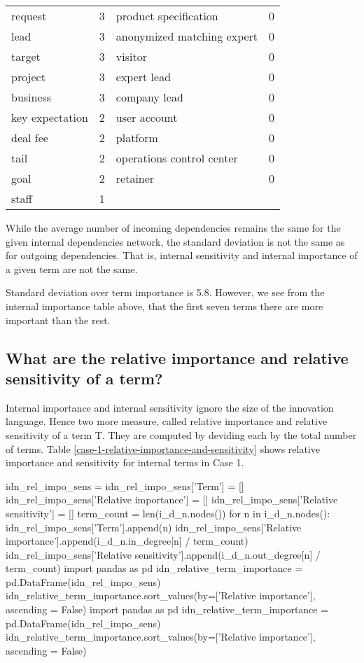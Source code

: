 \begin{longtable}{@{}llll@{}}
request         & 3          & product specification      & 0          \\
lead            & 3          & anonymized matching expert & 0          \\
target          & 3          & visitor                    & 0          \\
project         & 3          & expert lead                & 0          \\
business        & 3          & company lead               & 0          \\
key expectation & 2          & user account               & 0          \\
deal fee        & 2          & platform                   & 0          \\
tail            & 2          & operations control center  & 0          \\
goal            & 2          & retainer                   & 0          \\
staff           & 1          &                            &            \\* \bottomrule
\end{longtable}

While the average number of incoming dependencies remains the same for the given internal dependencies network, the standard deviation is not the same as for outgoing dependencies. That is, internal sensitivity and internal importance of a given term are not the same. 

Standard deviation over term importance is 5.8. However, we see from the internal importance table above, that the first seven terms there are more important than the rest.

\subsection{What are the relative importance and relative sensitivity of a term?}
\label{c7:s3:ss6}
Internal importance and internal sensitivity ignore the size of the innovation language. Hence two more measure, called relative importance and relative sensitivity of a term T. They are computed by deviding each by the total number of terms. Table \ref{case-1-relative-importance-and-sensitivity} shows relative importance and sensitivity for internal terms in Case 1.

\begin{pycode}
idn_rel_impo_sens = {}
idn_rel_impo_sens['Term'] = []
idn_rel_impo_sens['Relative importance'] = []
idn_rel_impo_sens['Relative sensitivity'] = []
term_count = len(i_d_n.nodes())
for n in i_d_n.nodes():
    idn_rel_impo_sens['Term'].append(n)
    idn_rel_impo_sens['Relative importance'].append(i_d_n.in_degree[n] / term_count) 
    idn_rel_impo_sens['Relative sensitivity'].append(i_d_n.out_degree[n] / term_count)
import pandas as pd
idn_relative_term_importance = pd.DataFrame(idn_rel_impo_sens)
idn_relative_term_importance.sort_values(by=['Relative importance'], ascending = False)
import pandas as pd
idn_relative_term_importance = pd.DataFrame(idn_rel_impo_sens)
idn_relative_term_importance.sort_values(by=['Relative importance'], ascending = False)
\end{pycode}


